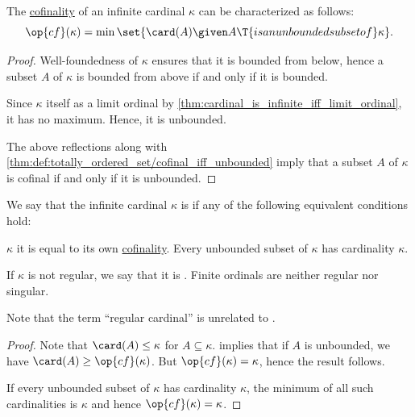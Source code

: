 \begin{proposition}\label{thm:cardinal_cofinality}
  The \hyperref[def:cofinality]{cofinality} of an infinite cardinal \( \kappa \) can be characterized as follows:
  \begin{equation*}
    \op{cf}(\kappa) = \min\set{ \card(A) \given A \T{is an unbounded subset of} \kappa }.
  \end{equation*}
\end{proposition}
\begin{proof}
  Well-foundedness of \( \kappa \) ensures that it is bounded from below, hence a subset \( A \) of \( \kappa \) is bounded from above if and only if it is bounded.

  Since \( \kappa \) itself as a limit ordinal by \cref{thm:cardinal_is_infinite_iff_limit_ordinal}, it has no maximum. Hence, it is unbounded.

  The above reflections along with \cref{thm:def:totally_ordered_set/cofinal_iff_unbounded} imply that a subset \( A \) of \( \kappa \) is cofinal if and only if it is unbounded.
\end{proof}

\begin{definition}\label{def:regular_cardinal}
  We say that the infinite cardinal \( \kappa \) is  if any of the following equivalent conditions hold:
  \begin{thmenum}
     \( \kappa \) it is equal to its own \hyperref[def:cofinality]{cofinality}.
     Every unbounded subset of \( \kappa \) has cardinality \( \kappa \).
  \end{thmenum}

  If \( \kappa \) is not regular, we say that it is . Finite ordinals are neither regular nor singular.
\end{definition}
\begin{comments}
  \item Note that the term \enquote{regular cardinal} is unrelated to .
\end{comments}
\begin{proof}
   Note that \( \card(A) \leq \kappa \) for \( A \subseteq \kappa \).  implies that if \( A \) is unbounded, we have \( \card(A) \geq \op{cf}(\kappa) \). But \( \op{cf}(\kappa) = \kappa \), hence the result follows.

   If every unbounded subset of \( \kappa \) has cardinality \( \kappa \), the minimum of all such cardinalities is \( \kappa \) and hence \( \op{cf}(\kappa) = \kappa \).
\end{proof}

